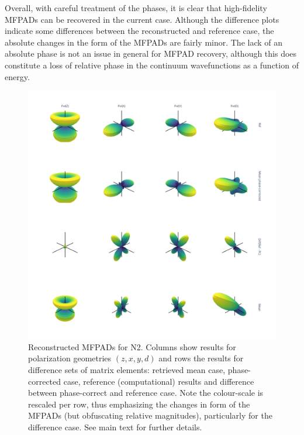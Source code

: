 \documentclass[10pt]{article}
\begin{document}
Overall, with careful treatment of the phases, it is clear that high-fidelity MFPADs can be recovered in the current case. Although the difference plots indicate some differences between the reconstructed and reference case, the absolute changes in the form of the MFPADs are fairly minor. The lack of an absolute phase is not an issue in general for MFPAD recovery, although this does constitute a loss of relative phase in the continuum wavefunctions as a function of energy. %


\begin{figure}[]
\begin{center}
\includegraphics[width=\textwidth,height=\dimexpr\textheight-4\baselineskip-\abovecaptionskip-\belowcaptionskip\relax,keepaspectratio]{figures/dataDump_1000fitTests_multiFit_noise_051021_MFPADs_130323_0.45_meanFix_xyFix.png}
\caption{Reconstructed MFPADs for N2. Columns show results for polarization geometries \((z,x,y,d)\) and rows the results for difference sets of matrix elements: retrieved mean case, phase-corrected case, reference (computational) results and difference between phase-correct and reference case. Note the colour-scale is rescaled per row, thus emphasizing the changes in form of the MFPADs (but obfuscating relative magnitudes), particularly for the difference case. See main text for further details.\label{454268}}
\end{center}
\end{figure}
\end{document}
